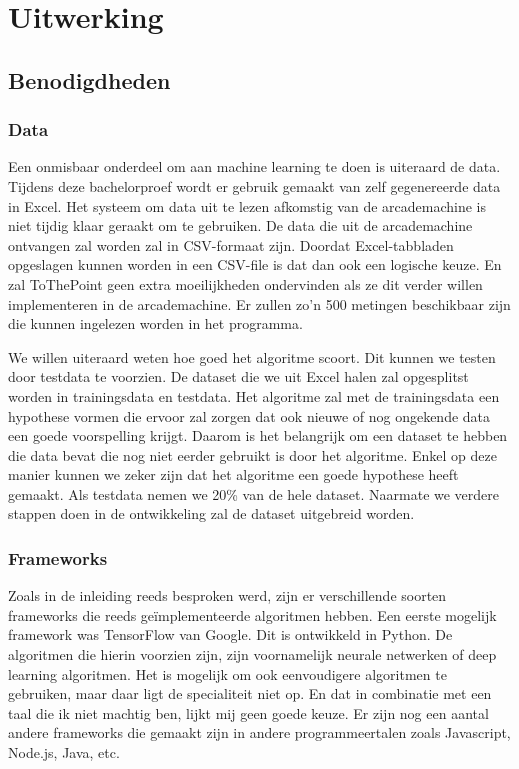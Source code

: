 
\chapter{Uitwerking}
\label{ch:uitwerking}


\section{Benodigdheden}
\label{sec:Benodigdheden}

\subsection{Data}
Een onmisbaar onderdeel om aan machine learning te doen is uiteraard de data. Tijdens deze bachelorproef wordt er gebruik gemaakt van zelf gegenereerde data in Excel. Het systeem om data uit te lezen afkomstig van de arcademachine is niet tijdig klaar geraakt om te gebruiken. De data die uit de arcademachine ontvangen zal worden zal in CSV-formaat zijn. Doordat Excel-tabbladen opgeslagen kunnen worden in een CSV-file is dat dan ook een logische keuze. En zal ToThePoint geen extra moeilijkheden ondervinden als ze dit verder willen implementeren in de arcademachine.
Er zullen zo'n 500 metingen beschikbaar zijn die kunnen ingelezen worden in het programma. 

We willen uiteraard weten hoe goed het algoritme scoort. Dit kunnen we testen door testdata te voorzien. De dataset die we uit Excel halen zal opgesplitst worden in trainingsdata en testdata. Het algoritme zal met de trainingsdata een hypothese vormen die ervoor zal zorgen dat ook nieuwe of nog ongekende data een goede voorspelling krijgt. Daarom is het belangrijk om een dataset te hebben die data bevat die nog niet eerder gebruikt is door het algoritme. Enkel op deze manier kunnen we zeker zijn dat het algoritme een goede hypothese heeft gemaakt. Als testdata nemen we 20\% van de hele dataset. Naarmate we verdere stappen doen in de ontwikkeling zal de dataset uitgebreid worden. 

\subsection{Frameworks}
Zoals in de inleiding reeds besproken werd, zijn er verschillende soorten frameworks die reeds geïmplementeerde algoritmen hebben. Een eerste mogelijk framework was TensorFlow van Google. Dit is ontwikkeld in Python. De algoritmen die hierin voorzien zijn, zijn voornamelijk neurale netwerken of deep learning algoritmen. Het is mogelijk om ook eenvoudigere algoritmen te gebruiken, maar daar ligt de specialiteit niet op. En dat in combinatie met een taal die ik niet machtig ben, lijkt mij geen goede keuze. Er zijn nog een aantal andere frameworks die gemaakt zijn in andere programmeertalen zoals Javascript, Node.js, Java, etc. 

